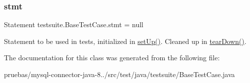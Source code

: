 \subsubsection{\texorpdfstring{stmt}{stmt}}
{\footnotesize\ttfamily Statement testsuite.\+Base\+Test\+Case.\+stmt = null\hspace{0.3cm}{\ttfamily [protected]}}

Statement to be used in tests, initialized in \mbox{\hyperlink{classtestsuite_1_1_base_test_case_a195f5d285c7979328734606d08ad15b1}{set\+Up()}}. Cleaned up in \mbox{\hyperlink{classtestsuite_1_1_base_test_case_a51c7d76ab24b0c966f956250fd7a4f52}{tear\+Down()}}. 

The documentation for this class was generated from the following file\+:\begin{DoxyCompactItemize}
\item 
pruebas/mysql-\/connector-\/java-\/8../src/test/java/testsuite/Base\+Test\+Case.\+java\end{DoxyCompactItemize}
